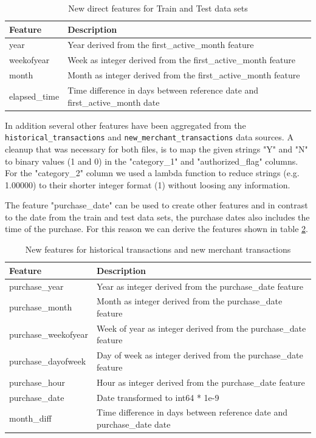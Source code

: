 \documentclass{article}
\begin{document}
\begin{table}[h]
 \caption{New direct features for Train and Test data sets}
  \centering
  \begin{tabular}{ll}
    \toprule
    Feature & Description\\
    \midrule
    year & Year derived from the first\_active\_month feature\\
    weekofyear & Week as integer derived from the first\_active\_month feature\\
    month & Month as integer derived from the first\_active\_month feature\\
    elapsed\_time & Time difference in days between reference date and first\_active\_month date\\
    \bottomrule
  \end{tabular}
  \label{tab:table_train_test}
\end{table}

In addition several other features have been aggregated from the \texttt{historical\_transactions} and \texttt{new\_merchant\_transactions} data sources. A cleanup that was necessary for both files, is to map the given strings "Y" and "N" to binary values (1 and 0) in the "category\_1" and "authorized\_flag" columns. For the "category\_2" column we used a lambda function to reduce strings (e.g. 1.00000) to their shorter integer format (1) without loosing any information.

The feature "purchase\_date" can be used to create other features and in contrast to the date from the train and test data sets, the purchase dates also includes the time of the purchase. For this reason we can derive the features shown in table \ref{tab:table_hist_new}.

\begin{table}[h]
 \caption{New features for historical transactions and new merchant transactions}
  \centering
  \begin{tabular}{ll}
    \toprule
    Feature & Description\\
    \midrule
    purchase\_year & Year as integer derived from the purchase\_date feature\\
    purchase\_month & Month as integer derived from the purchase\_date feature\\
    purchase\_weekofyear & Week of year as integer derived from the purchase\_date feature\\
    purchase\_dayofweek & Day of week as integer derived from the purchase\_date feature\\
    purchase\_hour & Hour as integer derived from the purchase\_date feature\\
    purchase\_date & Date transformed to int64 * 1e-9\\
    month\_diff & Time difference in days between reference date and purchase\_date date\\
    \bottomrule
  \end{tabular}
  \label{tab:table_hist_new}
\end{table}
\end{document}
